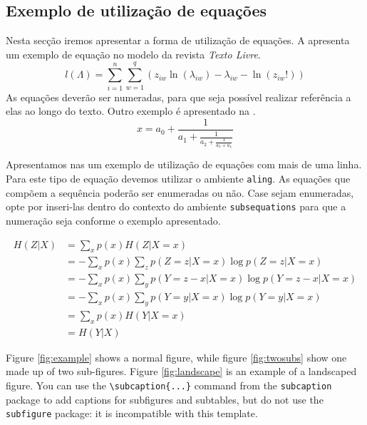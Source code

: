 \documentclass{textolivre}
\begin{document}
\subsection{Exemplo de utilização de equações}\label{sec-equacao}
Nesta secção iremos apresentar a forma de utilização de equações. A  apresenta um
exemplo de equação no modelo da revista \textit{Texto Livre}.
\begin{equation}
l(\Lambda)=\sum_{i=1}^{n} \sum_{w=1}^{q} (z_{i w} \ln (\lambda_{i w}) - \lambda_{i w} - \ln (z_{i w}!))
\label{eq-poisson}
\end{equation}
As equações deverão ser numeradas, para que seja possível realizar referência a elas ao longo do texto.
Outro exemplo é apresentado na .
\begin{equation}
  x = a_0 + \frac{1}{\displaystyle a_1 
          + \frac{1}{\displaystyle a_2 
          + \frac{1}{\displaystyle a_3 + a_4}}}
\label{eq-frac}
\end{equation}

Apresentamos nas  um exemplo de utilização de equações com mais de uma linha. Para este tipo de equação devemos utilizar o ambiente \texttt{aling}. As equações que compõem a sequência poderão ser enumeradas ou não. Case sejam enumeradas, opte por inseri-las dentro do contexto do ambiente \texttt{subsequations} para que a numeração seja conforme o exemplo apresentado.

\begin{subequations}
\begin{align}
H(Z|X) &= \sum_x p(x) H(Z|X=x) \label{eq-align-ex1} \\
       &= - \sum_x p(x) \sum_z p(Z=z|X=x) \log p(Z=z|X=x) \label{eq-align-ex2}\\
       &= - \sum_x p(x) \sum_y p(Y=z-x|X=x) \log p(Y=z-x|X=x) \label{eq-align-ex3} \\
       &= - \sum_x p(x) \sum_y p(Y=y|X=x) \log p(Y=y|X=x) \label{eq-align-ex4} \\
       &= \sum_x p(x) H(Y|X=x) \label{eq-align-ex5} \\
       &= H(Y|X) \label{eq-align-ex6}
\end{align}
\end{subequations}

Figure \ref{fig:example} shows a normal figure, while figure \ref{fig:twosubs} show one made up of two sub-figures. Figure \ref{fig:landscape} is an example of a landscaped figure. You can use the \verb|\subcaption{...}| command from the \texttt{subcaption} package to add captions for subfigures and subtables, but do not use the \texttt{subfigure} package: it is incompatible with this template.
\end{document}
